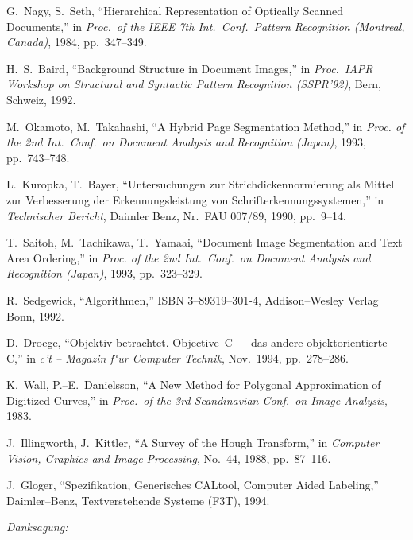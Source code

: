 \begin{thebibliography}{9999}
 G.~Nagy, S.~Seth, "`Hierarchical Representation of
  Optically Scanned Documents,"' in {\em Proc.~of the IEEE 7th
    Int.~Conf.~Pattern Recognition (Montreal, Canada)}, 1984,
  pp.~347--349.
  

 H.~S.~Baird, "`Background Structure in Document Images,"' in
  {\em Proc.\ IAPR Workshop on Structural and Syntactic Pattern Recognition (SSPR'92)}, Bern,
  Schweiz, 1992.

 M.~Okamoto, M.~Takahashi, "`A Hybrid Page Segmentation Method,"'
  in {\em Proc. of the 2nd Int.~Conf.~on Document Analysis and
  Recognition (Japan)}, 1993, pp.~743--748.

 L.~Kuropka, T.~Bayer, "`Untersuchungen zur Strichdickennormierung
  als Mittel zur Verbesserung der Erkennungsleistung von Schrifterkennungssystemen,"' in {\em
  Technischer Bericht}, Daimler Benz, Nr.\ FAU 007/89, 1990, pp.\ 9--14.

 T.~Saitoh, M.~Tachikawa, T.~Yamaai, "`Document Image 
  Segmentation and Text Area Ordering,"' in
  {\em Proc. of the 2nd Int.~Conf.~on Document Analysis and
    Recognition (Japan)}, 1993, pp.~323--329.
    

 R.~Sedgewick, "`Algorithmen,"' ISBN 3--89319--301-4,
  Addison--Wesley Verlag Bonn, 1992.

 D.~Droege, "`Objektiv betrachtet. Objective--C --- das andere
  objektorientierte C,"' in {\em c't -- Magazin f"ur Computer Technik\/}, Nov.\ 1994, pp.~278--286.

 K.~Wall, P.--E.~Danielsson, "`A New Method for Polygonal
  Approximation of Digitized Curves,"' in {\em Proc.\ of the 3rd Scandinavian Conf.\ on
  Image Analysis\/}, 1983.

 J.~Illingworth, J.~Kittler, "`A Survey of the Hough
  Transform,"' in {\em Computer Vision, Graphics and Image Processing\/}, No.\ 44, 1988,
  pp.~87--116.

 J.~Gloger, "`Spezifikation, Generisches CALtool, Computer Aided
  Labeling,"' Daimler--Benz, Textverstehende Systeme (F3T), 1994.

\end{thebibliography}
\clearpage
{}
{\em Danksagung:}

